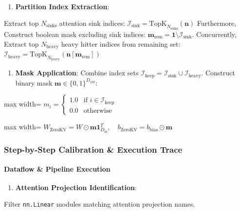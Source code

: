 \begin{enumerate}
\item \textbf{Partition Index Extraction}:
\end{enumerate}
Extract top $N_{\text{sinks}}$ attention sink indices: $\displaystyle \mathcal{I}_{\text{sink}} = \text{TopK}_{N_{\text{sinks}}}\left( \mathbf{n} \right)$ Furthermore, Construct boolean mask excluding sink indices: $\mathbf{m}_{\text{rem}} = \mathbf{1} \setminus \mathcal{I}_{\text{sink}}$. Concurrently, Extract top $N_{\text{heavy}}$ heavy hitter indices from remaining set: $\displaystyle \mathcal{I}_{\text{heavy}} = \text{TopK}_{N_{\text{heavy}}}\left( \mathbf{n}[\mathbf{m}_{\text{rem}}] \right)$


\begin{enumerate}
\item \textbf{Mask Application}:
Combine index sets $\mathcal{I}_{\text{keep}} = \mathcal{I}_{\text{sink}} \cup \mathcal{I}_{\text{heavy}}$. Construct binary mask $\mathbf{m} \in \{0, 1\}^{D_{\text{out}}}$:
\end{enumerate}
\begin{center}
\begin{adjustbox}{max width=\columnwidth}
$\displaystyle
m_i = \begin{cases} 1.0 & \text{if } i \in \mathcal{I}_{\text{keep}} \\ 0.0 & \text{otherwise} \end{cases}
$
\end{adjustbox}
\end{center}
\begin{center}
\begin{adjustbox}{max width=\columnwidth}
$\displaystyle
W_{\text{ZeroKV}} = W \odot \mathbf{m} \mathbf{1}_{D_{\text{in}}}^T, \quad b_{\text{ZeroKV}} = b_{\text{bias}} \odot \mathbf{m}
$
\end{adjustbox}
\end{center}


\subsubsection*{Step-by-Step Calibration \& Execution Trace}

\paragraph{Dataflow \& Pipeline Execution}

\begin{enumerate}
\item \textbf{Attention Projection Identification}:
\end{enumerate}
Filter \texttt{nn.Linear} modules matching attention projection names.

